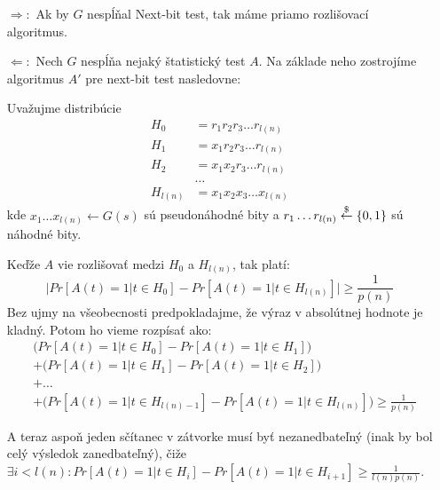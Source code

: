 \begin{dokaz}
    \noindent
    \begin{itemize}
    \item[$\Rightarrow:$]
        Ak by $G$ nespĺňal Next-bit test,
        tak máme priamo rozlišovací algoritmus.

    \item[$\Leftarrow:$]
        Nech $G$ nespĺňa nejaký štatistický test $A$.
        Na základe neho zostrojíme algoritmus $A'$ pre next-bit test nasledovne:

        Uvažujme distribúcie 
        \begin{align*}
            H_0 &= r_1 r_2 r_3 \dots r_{l(n)} \\
            H_1 &= x_1 r_2 r_3 \dots r_{l(n)} \\
            H_2 &= x_1 x_2 r_3 \dots r_{l(n)} \\
            &\dots \\
            H_{l(n)} &= x_1 x_2 x_3 \dots x_{l(n)}
        \end{align*}
        kde $x_1 \dots x_{l(n)} \leftarrow G(s)$ sú pseudonáhodné bity
        a $r_1 \dots r_{l(n)} \overset{\$}{\leftarrow} \{0,1\}$ sú náhodné bity.

        Keďže $A$ vie rozlišovať medzi $H_0$ a $H_{l(n)}$, tak platí:
        \begin{equation*}
            \Big|Pr[A(t) = 1 | t \in H_0] - 
                 Pr[A(t) = 1 | t \in H_{l(n)}] \Big| 
            \geq \frac{1}{p(n)}
        \end{equation*}
        Bez ujmy na všeobecnosti predpokladajme, 
        že výraz v absolútnej hodnote je kladný.
        Potom ho vieme rozpísať ako:
        \begin{equation*}
        \begin{split}
        &\Big(Pr[A(t) = 1 | t \in H_0] - 
                Pr[A(t) = 1 | t \in H_{1}] \Big) \\ 
        &+\Big(Pr[A(t) = 1 | t \in H_1] - 
                Pr[A(t) = 1 | t \in H_{2}]\Big)\\
        &+ \dots \\
        &+ \Big(Pr[A(t) = 1 | t \in H_{l(n)-1}] - 
                Pr[A(t) = 1 | t \in H_{l(n)}] \Big) \geq \frac{1}{p(n)}
        \end{split}
        \end{equation*}

        A teraz aspoň jeden sčítanec v zátvorke musí byť nezanedbateľný 
        (inak by bol celý výsledok zanedbateľný), čiže 
        $\exists i < l(n)\colon Pr[A(t) = 1 | t \in H_{i}] - 
            Pr[A(t) = 1 | t \in H_{i+1}] \geq \frac{1}{l(n)p(n)}$.


\end{itemize}
\end{dokaz}
